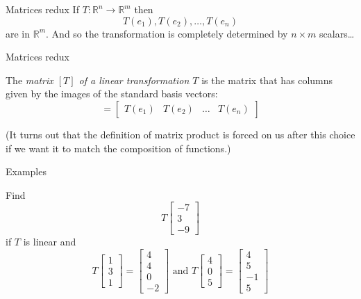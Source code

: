 \documentclass{beamer}
\begin{document}
\begin{frame}{Matrices redux}
If $T:\mathbb{R}^n \rightarrow \mathbb{R}^m$ then
\begin{equation*}
T(e_1), T(e_2),\dots, T(e_n)
\end{equation*}
are in $\mathbb{R}^m$. And so the transformation is completely determined by $n\times m$ scalars\dots
\end{frame}

\begin{frame}{Matrices redux}
\begin{definition}
The \emph{matrix $[T]$ of a linear transformation $T$} is the matrix that has columns given by the images of the standard basis vectors:
\begin{equation*}
[T] = \left[
\begin{array}{cccc}
T(e_1) & T(e_2) &\dots & T(e_n)
\end{array}
\right]
\end{equation*} 
\end{definition}\vfill
(It turns out that the definition of matrix product is forced on us after this choice if we want it to match the composition of functions.)
\end{frame}

\begin{frame}{Examples}
\begin{example}
	Find
	\begin{equation*}
	T \left[
	\begin{array}{c}
	-7\\
	3\\
	-9
	\end{array}
	\right]
	\end{equation*}
	if $T$ is linear and
	\begin{equation*}
	T \left[
	\begin{array}{c}
	1\\
	3\\
	1
	\end{array}
	\right] = \left[
	\begin{array}{c}
	4\\
	4\\
	0\\
	-2
	\end{array}
	\right]\text{ and } T \left[
	\begin{array}{c}
	4\\
	0\\
	5
	\end{array}
	\right] = \left[
	\begin{array}{c}
	4\\
	5\\
	-1\\
	5
	\end{array}
	\right]
	\end{equation*}
\end{example}
\end{frame}
\end{document}
